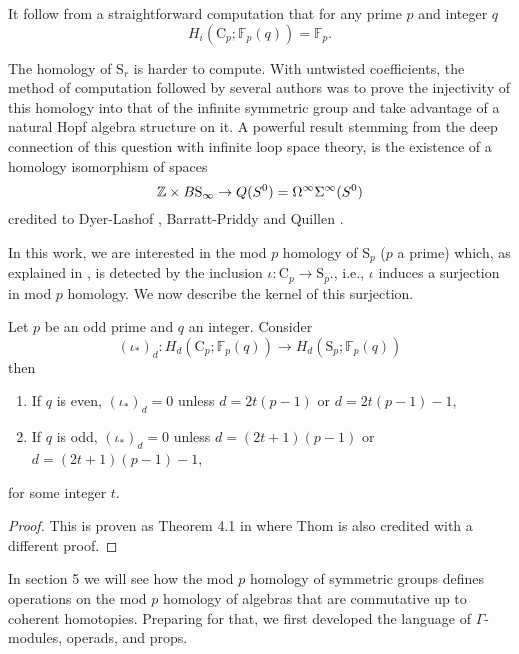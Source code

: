 It follow from a straightforward computation that for any prime $p$ and integer $q$
\begin{equation*}
H_i(\mathrm{C}_p; \mathbb{F}_p(q)) = \mathbb{F}_p.
\end{equation*}

The homology of $\mathrm{S}_r$ is harder to compute.
With untwisted coefficients, the method of computation followed by several authors was to prove the injectivity of this homology into that of the infinite symmetric group and take advantage of a natural Hopf algebra structure on it.
A powerful result stemming from the deep connection of this question with infinite loop space theory, is the existence of a homology isomorphism of spaces
\begin{equation*}
\mathbb{Z} \times B\mathrm{S}_\infty \to Q(S^0) = \Omega^\infty \Sigma^\infty (S^0)
\end{equation*}
credited to Dyer-Lashof \cite{dyer62lashof}, Barratt-Priddy and Quillen \cite{barratt1972priddy}.

In this work, we are interested in the mod $p$ homology of $\mathrm{S}_p$ ($p$ a prime) which, as explained in \cite[Corollary~VI.1.4]{adem2004milgram}, is detected by the inclusion $\iota \colon \mathrm{C}_p \to \mathrm{S}_p$., i.e., $\iota$ induces a surjection in mod $p$ homology.
We now describe the kernel of this surjection.

\begin{lemma} \label{lem: Thom's theorem}
	Let $p$ be an odd prime and $q$ an integer.
	Consider
	\begin{equation*}
	(\iota_\ast)_d \colon H_d(\mathrm{C}_p; \mathbb{F}_p(q)) \to H_d(\mathrm{S}_p; \mathbb{F}_p(q))
	\end{equation*}
	then
	\begin{enumerate}
		\item If $q$ is even, $(\iota_\ast)_d = 0$ unless $d = 2t(p-1)$ or $d = 2t(p-1) - 1$,
		\item If $q$ is odd, $(\iota_\ast)_d = 0$ unless $d = (2t+1)(p-1)$ or $d = (2t+1)(p-1)-1$,
	\end{enumerate}
	for some integer $t$.
\end{lemma}

\begin{proof}
	This is proven as Theorem 4.1 in \cite{steenrod53cyclic} where Thom is also credited with a different proof.
\end{proof}

In section 5 we will see how the mod $p$ homology of symmetric groups defines operations on the mod $p$ homology of algebras that are commutative up to coherent homotopies.
Preparing for that, we first developed the language of $\Gamma$-modules, operads, and props.